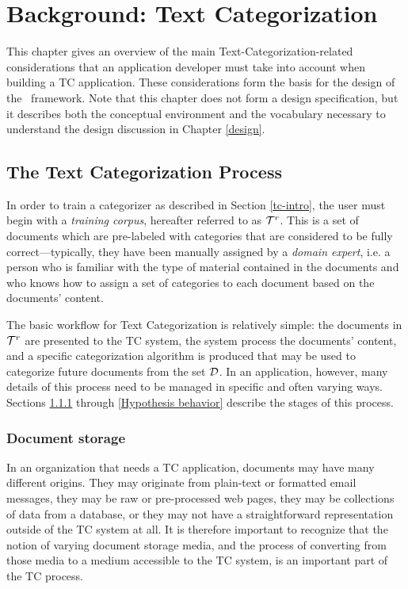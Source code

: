 \chapter{Background: Text Categorization}
\label{background-tc}

This chapter gives an overview of the main Text-Categorization-related
considerations that an application developer must take into account
when building a TC application.  These considerations form the basis
for the design of the \aicat\ framework.  Note that this chapter does
not form a design specification, but it describes both the conceptual
environment and the vocabulary necessary to understand the design
discussion in Chapter \ref{design}.

\section{The Text Categorization Process}

In order to train a categorizer as described in Section
\ref{tc-intro}, the user must begin with a \emph{training corpus},
hereafter referred to as $\mathcal{T}^r$.  This is a set of documents which
are pre-labeled with categories that are considered to be fully
correct---typically, they have been manually assigned by a
\emph{domain expert}, i.e. a person who is familiar with the type of
material contained in the documents and who knows how to assign a set
of categories to each document based on the documents' content.

The basic workflow for Text Categorization is relatively simple: the
documents in $\mathcal{T}^r$ are presented to the TC system, the system
process the documents' content, and a specific categorization
algorithm is produced that may be used to categorize future documents
from the set $\mathcal{D}$.  In an application, however, many details of
this process need to be managed in specific and often varying ways.
Sections \ref{Document storage} through \ref{Hypothesis behavior}
describe the stages of this process.

\subsection{Document storage}
\label{Document storage}

In an organization that needs a TC application, documents may have
many different origins.  They may originate from plain-text or
formatted email messages, they may be raw or pre-processed web pages,
they may be collections of data from a database, or they may not have
a straightforward representation outside of the TC system at all.  It
is therefore important to recognize that the notion of varying
document storage media, and the process of converting from those media
to a medium accessible to the TC system, is an important part of the
TC process.

